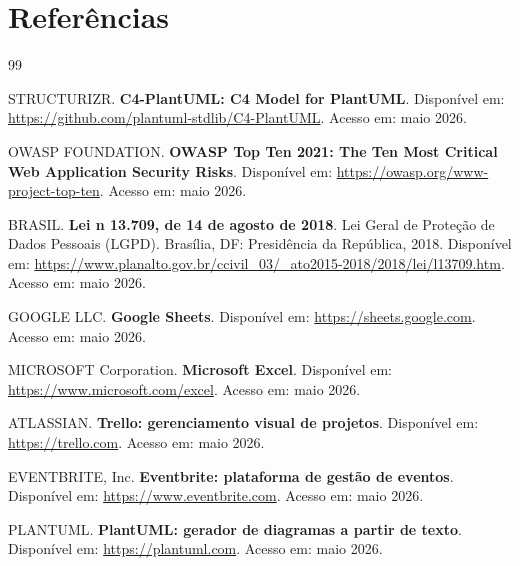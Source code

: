 \documentclass[12pt,a4paper]{article}
\begin{document}

\section{Referências}

\begin{thebibliography}{99}


STRUCTURIZR.
\textbf{C4-PlantUML: C4 Model for PlantUML}.
Disponível em:
\url{https://github.com/plantuml-stdlib/C4-PlantUML}.
Acesso em: maio 2026.


OWASP FOUNDATION.
\textbf{OWASP Top Ten 2021: The Ten Most Critical Web Application Security Risks}.
Disponível em: \url{https://owasp.org/www-project-top-ten}.
Acesso em: maio 2026.


BRASIL.
\textbf{Lei n\textordmasculine{} 13.709, de 14 de agosto de 2018}.
Lei Geral de Proteção de Dados Pessoais (LGPD). Brasília, DF: Presidência
da República, 2018. Disponível em:
\url{https://www.planalto.gov.br/ccivil_03/_ato2015-2018/2018/lei/l13709.htm}.
Acesso em: maio 2026.


GOOGLE LLC.
\textbf{Google Sheets}.
Disponível em: \url{https://sheets.google.com}. Acesso em: maio 2026.

MICROSOFT Corporation.
\textbf{Microsoft Excel}.
Disponível em: \url{https://www.microsoft.com/excel}. Acesso em: maio 2026.

ATLASSIAN.
\textbf{Trello: gerenciamento visual de projetos}.
Disponível em: \url{https://trello.com}. Acesso em: maio 2026.

EVENTBRITE, Inc.
\textbf{Eventbrite: plataforma de gestão de eventos}.
Disponível em: \url{https://www.eventbrite.com}. Acesso em: maio 2026.


PLANTUML.
\textbf{PlantUML: gerador de diagramas a partir de texto}.
Disponível em: \url{https://plantuml.com}. Acesso em: maio 2026.

\end{thebibliography}
\end{document}

